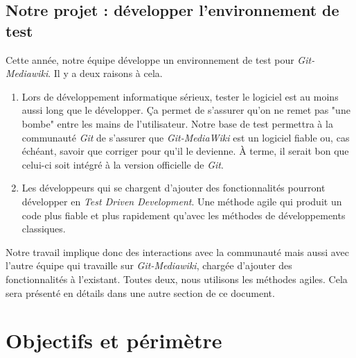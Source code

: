 \documentclass[11pt]{article}
\begin{document}
\subsection{Notre projet : développer l'environnement de test}
Cette année, notre équipe développe un environnement de test pour \textit{Git-Mediawiki}. Il y a deux raisons à cela.
\begin{enumerate}
\item Lors de développement informatique sérieux, tester le logiciel est au moins aussi long que le développer. Ça permet de s'assurer qu'on ne remet pas "une bombe" entre les mains de l'utilisateur. Notre base de test permettra à la communauté \textit{Git} de s'assurer que \textit{Git-MediaWiki} est un logiciel fiable ou, cas échéant, savoir que corriger pour qu'il le devienne. À terme, il serait bon que celui-ci soit intégré à la version officielle de \textit{Git}.
\item Les développeurs qui se chargent d'ajouter des fonctionnalités pourront développer en \textit{Test Driven Development}. Une méthode agile qui produit un code plus fiable et plus rapidement qu'avec les méthodes de développements classiques.
\end{enumerate}
Notre travail implique donc des interactions avec la communauté mais aussi avec l'autre équipe qui travaille sur \textit{Git-Mediawiki}, chargée d'ajouter des fonctionnalités à l'existant. Toutes deux, nous utilisons les méthodes agiles. Cela sera présenté en détails dans une autre section de ce document.

\section{Objectifs et périmètre}
\end{document}
